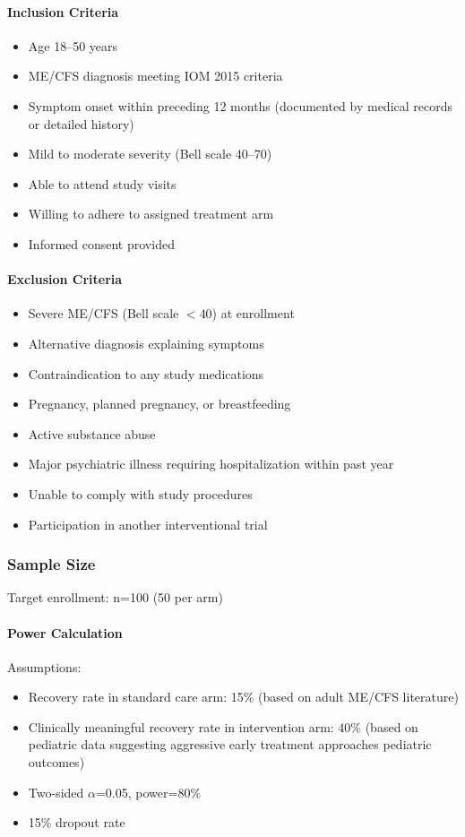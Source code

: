 \paragraph{Inclusion Criteria}
\begin{itemize}
    \item Age 18--50 years
    \item ME/CFS diagnosis meeting IOM 2015 criteria
    \item Symptom onset within preceding 12 months (documented by medical records or detailed history)
    \item Mild to moderate severity (Bell scale 40--70)
    \item Able to attend study visits
    \item Willing to adhere to assigned treatment arm
    \item Informed consent provided
\end{itemize}

\paragraph{Exclusion Criteria}
\begin{itemize}
    \item Severe ME/CFS (Bell scale $<$40) at enrollment
    \item Alternative diagnosis explaining symptoms
    \item Contraindication to any study medications
    \item Pregnancy, planned pregnancy, or breastfeeding
    \item Active substance abuse
    \item Major psychiatric illness requiring hospitalization within past year
    \item Unable to comply with study procedures
    \item Participation in another interventional trial
\end{itemize}

\subsubsection{Sample Size}
Target enrollment: n=100 (50 per arm)

\paragraph{Power Calculation}
Assumptions:
\begin{itemize}
    \item Recovery rate in standard care arm: 15\% (based on adult ME/CFS literature)
    \item Clinically meaningful recovery rate in intervention arm: 40\% (based on pediatric data suggesting aggressive early treatment approaches pediatric outcomes)
    \item Two-sided $\alpha$=0.05, power=80\%
    \item 15\% dropout rate
\end{itemize}

